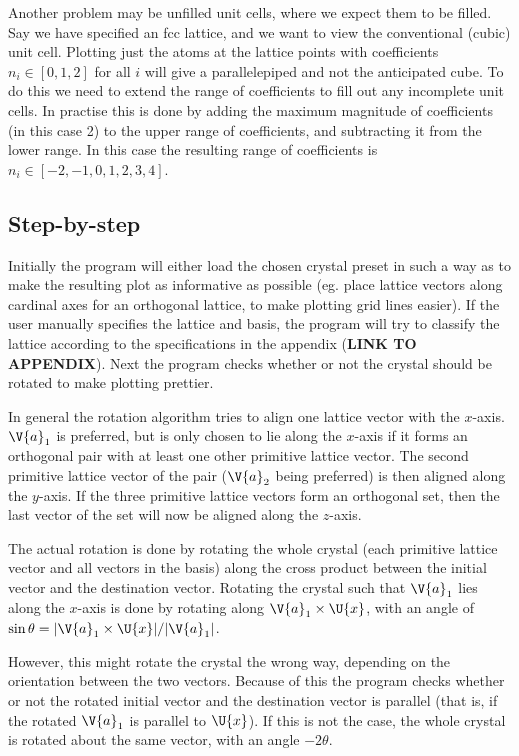 \documentclass[main.tex]{subfiles}
\begin{document}
	Another problem may be unfilled unit cells, where we expect them to be filled. Say we have specified an fcc lattice, and we want to view the conventional (cubic) unit cell. Plotting just the atoms at the lattice points with coefficients $ n_i \in [0,1,2] $ for all $ i $ will give a parallelepiped and not the anticipated cube. To do this we need to extend the range of coefficients to fill out any incomplete unit cells. In practise this is done by adding the maximum magnitude of coefficients (in this case 2) to the upper range of coefficients, and subtracting it from the lower range. In this case the resulting range of coefficients is $ n_i \in [-2, -1, 0, 1, 2, 3, 4] $.
	
	
	\subsection{Step-by-step}
	Initially the program will either load the chosen crystal preset in such a way as to make the resulting plot as informative as possible (eg. place lattice vectors along cardinal axes for an orthogonal lattice, to make plotting grid lines easier). If the user manually specifies the lattice and basis, the program will try to classify the lattice according to the specifications in the appendix (\textbf{LINK TO APPENDIX}). Next the program checks whether or not the crystal should be rotated to make plotting prettier.
	
	In general the rotation algorithm tries to align one lattice vector with the $ x $-axis. $ \V{a}_1 $ is preferred, but is only chosen to lie along the $ x $-axis if it forms an orthogonal pair with at least one other primitive lattice vector. The second primitive lattice vector of the pair ($\V{a}_2$ being preferred) is then aligned along the $ y $-axis. If the three primitive lattice vectors form an orthogonal set, then the last vector of the set will now be aligned along the $ z $-axis.
	
	The actual rotation is done by rotating the whole crystal (each primitive lattice vector and all vectors in the basis) along the cross product between the initial vector and the destination vector. Rotating the crystal such that $ \V{a}_1 $ lies along the $ x $-axis is done by rotating along $ \V{a}_1 \times \U{x} $, with an angle of $ \sin \theta = |\V{a}_1 \times \U{x}| / |\V{a}_1| $.
	
	However, this might rotate the crystal the wrong way, depending on the orientation between the two vectors. Because of this the program checks whether or not the rotated initial vector and the destination vector is parallel (that is, if the rotated $ \V{a}_1 $ is parallel to $ \U{x} $). If this is not the case, the whole crystal is rotated about the same vector, with an angle $ -2\theta $.
	
\end{document}
